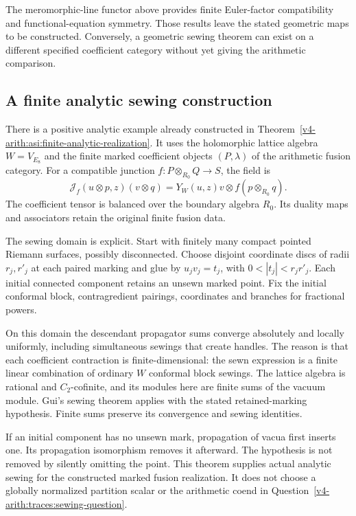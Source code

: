 The meromorphic-line functor above provides finite Euler-factor
compatibility and functional-equation symmetry. Those results leave the
stated geometric maps to be constructed. Conversely, a geometric sewing
theorem can exist on a different specified coefficient category without yet
giving the arithmetic comparison.

\subsection{A finite analytic sewing construction}

There is a positive analytic example already constructed in
Theorem~\ref{v4-arith:asi:finite-analytic-realization}. It uses the
holomorphic lattice algebra $W=V_{E_8}$ and the finite marked coefficient
objects $(P,\lambda)$ of the arithmetic fusion category. For a compatible
junction $f:P\otimes_{R_0}Q\to S$, the field is
\[
 \mathcal J_f(u\otimes p,z)(v\otimes q)
    =Y_W(u,z)v\otimes f(p\otimes_{R_0}q).
\]
The coefficient tensor is balanced over the boundary algebra $R_0$. Its
duality maps and associators retain the original finite fusion data.

The sewing domain is explicit. Start with finitely many compact pointed
Riemann surfaces, possibly disconnected. Choose disjoint coordinate discs of
radii $r_j,r'_j$ at each paired marking and glue by $u_jv_j=t_j$, with
$0<|t_j|<r_jr'_j$. Each initial connected component retains an unsewn marked
point. Fix the initial conformal block, contragredient pairings, coordinates
and branches for fractional powers.

On this domain the descendant propagator sums converge absolutely and
locally uniformly, including simultaneous sewings that create handles. The
reason is that each coefficient contraction is finite-dimensional: the sewn
expression is a finite linear combination of ordinary $W$ conformal block
sewings. The lattice algebra is rational and $C_2$-cofinite, and its modules
here are finite sums of the vacuum module. Gui's sewing theorem applies with
the stated retained-marking hypothesis. Finite sums preserve its convergence
and sewing identities.

If an initial component has no unsewn mark, propagation of vacua first
inserts one. Its propagation isomorphism removes it afterward. The
hypothesis is not removed by silently omitting the point. This theorem
supplies actual analytic sewing for the constructed marked fusion
realization. It does not choose a globally normalized partition scalar or
the arithmetic coend in Question~\ref{v4-arith:traces:sewing-question}.

